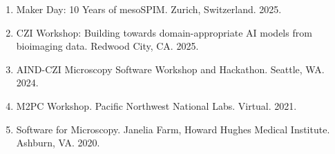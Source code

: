 \begin{enumerate}  
\item Maker Day: 10 Years of mesoSPIM. Zurich, Switzerland. 2025.
\item CZI Workshop: Building towards domain-appropriate AI models from bioimaging data. Redwood City, CA. 2025.
\item AIND-CZI Microscopy Software Workshop and Hackathon. Seattle, WA. 2024.
\item M2PC Workshop.  Pacific Northwest National Labs. Virtual. 2021.
\item Software for Microscopy.  Janelia Farm, Howard Hughes Medical Institute.  Ashburn, VA. 2020. 
\end{enumerate}